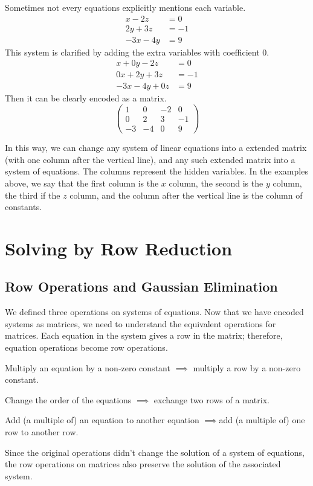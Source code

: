 \documentclass[fleqn]{report}
\begin{document}
\begin{example}
Sometimes not every equations explicitly mentions each variable. 
\begin{align*}
x-2z & = 0 \\
2y + 3z & = - 1\\
-3x - 4y & = 9
\end{align*}
This system is clarified by adding the extra
variables with coefficient $0$.
\begin{align*}
x + 0y -2z & = 0 \\
0x + 2y + 3z & = - 1\\
-3x - 4y + 0z & = 9
\end{align*}
Then it can be clearly encoded as a matrix.
\begin{displaymath}
\left(
\begin{array}{ccc|c}
1 & 0 & -2 & 0 \\
0 & 2 & 3 & -1 \\
-3 & -4 & 0 & 9 
\end{array}
\right)
\end{displaymath}
\end{example}

In this way, we can change any system of linear equations into a
extended matrix (with one column after the vertical line), and
any such extended matrix into a system of equations. The
columns represent the hidden variables. In the examples above, we say
that the first column is the $x$ column, the second is the $y$
column, the third if the $z$ column, and the column after the
vertical line is the column of constants.

\chapter{Solving by Row Reduction}

\section{Row Operations and Gaussian Elimination}

We defined three operations on systems of equations.
Now that we have encoded systems as matrices, we need to
understand the equivalent operations for matrices. Each equation in the
system gives a row in the matrix; therefore, equation
operations become row operations. 
\begin{smallitemize}
\item Multiply an equation by a non-zero constant $\implies$ multiply a
row by a non-zero constant.
\item Change the order of the equations $\implies$ exchange two
rows of a matrix.
\item Add (a multiple of) an equation to another equation
$\implies $add (a multiple of) one row to another row.
\end{smallitemize}
Since the original operations didn't change the solution of a system of
equations, the row operations on matrices also preserve the
solution of the associated system.
\end{document}
